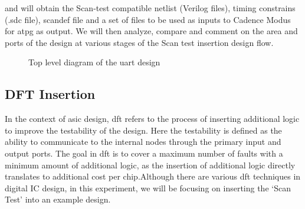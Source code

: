 \documentclass[a4paper,11pt]{article}%
\begin{document}
and will obtain the Scan-test compatible netlist (Verilog files), timing constrains (.sdc file), scan\ac{def} file and a set of files to be used as inputs to Cadence Modus for \ac{atpg} as output. We will then analyze, compare and comment on the area and ports of the design at various stages of the Scan test insertion design flow.

\begin{figure}[h]
	\centering
	\caption{Top level diagram of the \ac{uart} design}
	\label{fig:top_level}
\end{figure}

\pagebreak
\subsection{DFT Insertion}

In the context of \ac{asic} design, \ac{dft} refers to the process of inserting additional logic to improve the testability of the design. Here the testability is defined as the ability to communicate to the internal nodes through the primary input and output ports. The goal in \ac{dft} is to cover a maximum number of faults with a minimum amount of additional logic, as the insertion of additional logic directly translates to additional cost per chip.Although there are various \ac{dft} techniques in digital IC design, in this experiment, we will be focusing on inserting the `Scan Test' into an example design.
\end{document}
